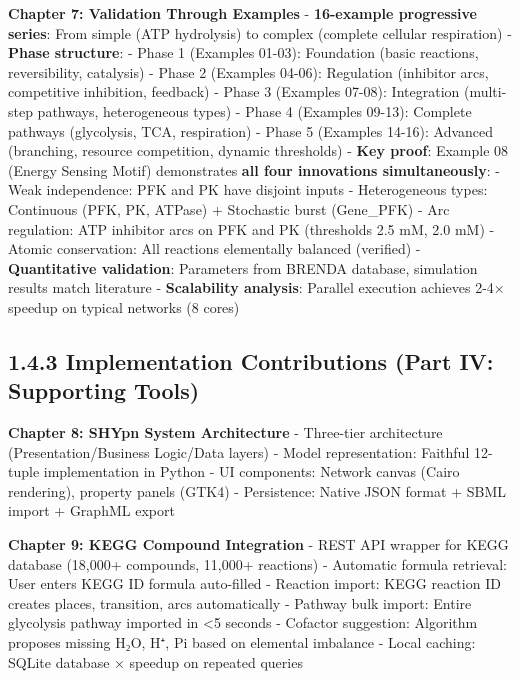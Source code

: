 \textbf{Chapter 7: Validation Through Examples} - \textbf{16-example
progressive series}: From simple (ATP hydrolysis) to complex (complete
cellular respiration) - \textbf{Phase structure}: - Phase 1 (Examples
01-03): Foundation (basic reactions, reversibility, catalysis) - Phase 2
(Examples 04-06): Regulation (inhibitor arcs, competitive inhibition,
feedback) - Phase 3 (Examples 07-08): Integration (multi-step pathways,
heterogeneous types) - Phase 4 (Examples 09-13): Complete pathways
(glycolysis, TCA, respiration) - Phase 5 (Examples 14-16): Advanced
(branching, resource competition, dynamic thresholds) - \textbf{Key
proof}: Example 08 (Energy Sensing Motif) demonstrates \textbf{all four
innovations simultaneously}: - Weak independence: PFK and PK have
disjoint inputs - Heterogeneous types: Continuous (PFK, PK, ATPase) +
Stochastic burst (Gene\_PFK) - Arc regulation: ATP inhibitor arcs on PFK
and PK (thresholds 2.5 mM, 2.0 mM) - Atomic conservation: All reactions
elementally balanced (verified) - \textbf{Quantitative validation}:
Parameters from BRENDA database, simulation results match literature -
\textbf{Scalability analysis}: Parallel execution achieves 2-4× speedup
on typical networks (8 cores)

\hypertarget{implementation-contributions-part-iv-supporting-tools}{%
\subsection{1.4.3 Implementation Contributions (Part IV: Supporting
Tools)}\label{implementation-contributions-part-iv-supporting-tools}}

\textbf{Chapter 8: SHYpn System Architecture} - Three-tier architecture
(Presentation/Business Logic/Data layers) - Model representation:
Faithful 12-tuple implementation in Python - UI components: Network
canvas (Cairo rendering), property panels (GTK4) - Persistence: Native
JSON format + SBML import + GraphML export

\textbf{Chapter 9: KEGG Compound Integration} - REST API wrapper for
KEGG database (18,000+ compounds, 11,000+ reactions) - Automatic formula
retrieval: User enters KEGG ID \textrightarrow formula auto-filled - Reaction import:
KEGG reaction ID \textrightarrow creates places, transition, arcs automatically -
Pathway bulk import: Entire glycolysis pathway imported in \textless5
seconds - Cofactor suggestion: Algorithm proposes missing H₂O, H⁺, Pi
based on elemental imbalance - Local caching: SQLite database ×
speedup on repeated queries


